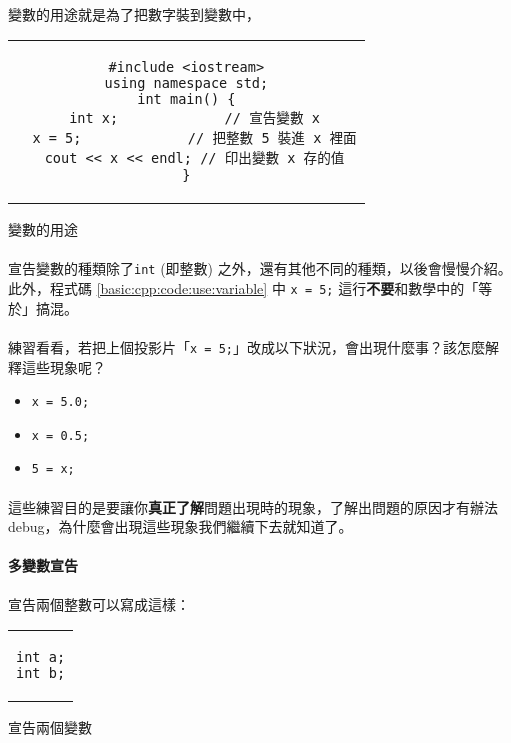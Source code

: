 \documentclass[12pt,a4paper,oneside]{article}
\begin{document}
\begin{CJK}{UTF8}{bkai}
\paragraph{}變數的用途就是為了把數字裝到變數中，
\begin{code}[h!]
\centering
\begin{tabular}{c}
\begin{lstlisting}
#include <iostream>
using namespace std;
int main() {
  int x;             // 宣告變數 x
  x = 5;             // 把整數 5 裝進 x 裡面
  cout << x << endl; // 印出變數 x 存的值
}
\end{lstlisting}
\end{tabular}
\caption{變數的用途}
\label{basic:cpp:code:use:variable}
\end{code}

\paragraph{}宣告變數的種類除了\lstinline!int! (即整數) 之外，還有其他不同的種類，以後會慢慢介紹。此外，程式碼 \ref{basic:cpp:code:use:variable} 中 \lstinline!x = 5;! 這行\textbf{不要}和數學中的「等於」搞混。
  
\paragraph{}練習看看，若把上個投影片「\lstinline!x = 5;!」改成以下狀況，會出現什麼事？該怎麼解釋這些現象呢？
\begin{itemize}
\item \lstinline!x = 5.0;!
\item \lstinline!x = 0.5;!
\item \lstinline!5 = x;!
\end{itemize}

\paragraph{}這些練習目的是要讓你\textbf{真正了解}問題出現時的現象，了解出問題的原因才有辦法 debug，為什麼會出現這些現象我們繼續下去就知道了。

\paragraph{多變數宣告}宣告兩個整數可以寫成這樣：
\begin{code}[h!]
\centering
\begin{tabular}{c}
\begin{lstlisting}
int a;
int b;
\end{lstlisting}
\end{tabular}
\caption{宣告兩個變數}
\label{basic:cpp:code:two:declare}
\end{code}


\end{CJK}
\end{document}
